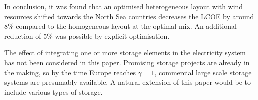 \documentclass[a4paper, 5p, sort&compress]{elsarticle}%
\begin{document}
In conclusion, it was found that an optimised heterogeneous layout
with wind resources shifted towards the North Sea countries decreases
the LCOE by around 8\% compared to the homogeneous layout at the
optimal mix. An additional reduction of 5\% was possible by explicit
optimisation. \newline


The effect of integrating one or more storage elements in the
electricity system has not been considered in this paper. Promising
storage projects are already in the making, so by the time Europe reaches
$\gamma = 1$, commercial large scale storage systems are presumably
available. A natural extension of this paper would be to include
various types of storage.




\end{document}

